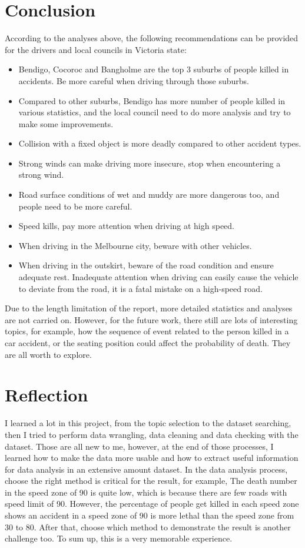 \documentclass[10pt]{article}
\theoremstyle{definition}
\begin{document}
\section{Conclusion}
\label{conslusion}
According to the analyses above, the following recommendations can be provided for the drivers and local councils in Victoria state:
\begin{itemize}
    \item Bendigo, Cocoroc and Bangholme are the top 3 suburbs of people killed in accidents. Be more careful when driving through those suburbs. 
    \item Compared to other suburbs, Bendigo has more number of people killed in various statistics, and the local council need to do more analysis and try to make some improvements.
    \item Collision with a fixed object is more deadly compared to other accident types.
    \item Strong winds can make driving more insecure, stop when encountering a strong wind.
    \item Road surface conditions of wet and muddy are more dangerous too, and people need to be more careful.
    \item Speed kills, pay more attention when driving at high speed.
    \item When driving in the Melbourne city, beware with other vehicles.
    \item When driving in the outskirt, beware of the road condition and ensure adequate rest. Inadequate attention when driving can easily cause the vehicle to deviate from the road, it is a fatal mistake on a high-speed road.
\end{itemize}
Due to the length limitation of the report, more detailed statistics and analyses are not carried on. However, for the future work, there still are lots of interesting topics, for example, how the sequence of event related to the person killed in a car accident, or the seating position could affect the probability of death. They are all worth to explore.\par

\section{Reflection}
I learned a lot in this project, from the topic selection to the dataset searching, then I tried to perform data wrangling, data cleaning and data checking with the dataset. Those are all new to me, however, at the end of those processes, I learned how to make the data more usable and how to extract useful information for data analysis in an extensive amount dataset. In the data analysis process, choose the right method is critical for the result, for example, The death number in the speed zone of 90 is quite low, which is because there are few roads with speed limit of 90. However, the percentage of people get killed in each speed zone shows an accident in a speed zone of 90 is more lethal than the speed zone from 30 to 80. After that, choose which method to demonstrate the result is another challenge too. To sum up, this is a very memorable experience.\par




\end{document}
